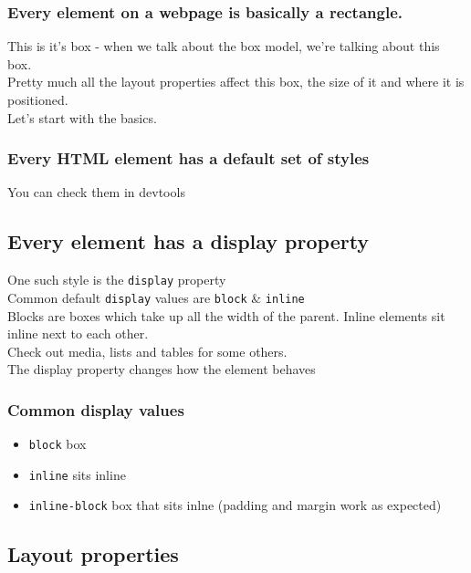 \subsubsection{Every element on a webpage is basically a rectangle.}

This is it's box - when we talk about the box model, we're talking about this box.
\\
Pretty much all the layout properties affect this box, the size of it and where it is positioned.
\\
Let's start with the basics.

\subsubsection{Every HTML element has a default set of styles}

You can check them in devtools

\subsection{Every element has a display property}

One such style is the \texttt{display} property
\\
Common default \texttt{display} values are \texttt{block} \& \texttt{inline}
\\
Blocks are boxes which take up all the width of the parent. Inline elements sit inline next to each other.
\\
Check out media, lists and tables for some others.
\\
The display property changes how the element behaves

\subsubsection{Common display values}

\begin{itemize}
    \item \texttt{block} box
    \item \texttt{inline} sits inline
    \item \texttt{inline-block} box that sits inlne (padding and margin work as expected)
\end{itemize}


\subsection{Layout properties}

